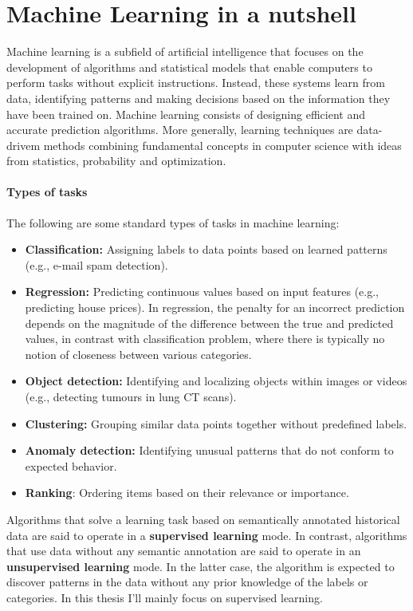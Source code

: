 \setlength{\headheight}{14.5pt} %
\addtolength{\topmargin}{-2.5pt} %
\chapter{Machine Learning in a nutshell} 

Machine learning is a subfield of artificial intelligence that focuses on the development of algorithms and statistical models that enable computers to perform tasks without explicit instructions. Instead, these systems learn from data, identifying patterns and making decisions based on the information they have been trained on.
Machine learning consists of designing efficient and accurate prediction algorithms. More generally, learning techniques are data-drivem methods combining fundamental concepts in computer science with ideas from statistics, probability and optimization.
\subsubsection{Types of tasks}
The following are some standard types of tasks in machine learning:
\begin{itemize}
    \item \textbf{Classification:} Assigning labels to data points based on learned patterns (e.g., e-mail spam detection).
    \item \textbf{Regression:} Predicting continuous values based on input features (e.g., predicting house prices). In regression, the penalty for an incorrect prediction depends on the magnitude of the difference between the true and predicted values, in contrast with classification problem, where there is typically no notion of closeness between various categories. 
    \item \textbf{Object detection:} Identifying and localizing objects within images or videos (e.g., detecting tumours in lung CT scans).
    \item \textbf{Clustering:} Grouping similar data points together without predefined labels.
    \item \textbf{Anomaly detection:} Identifying unusual patterns that do not conform to expected behavior.
    \item \textbf{Ranking}: Ordering items based on their relevance or importance.
\end{itemize}

Algorithms that solve a learning task based on semantically annotated historical data are said to operate in a \textbf{supervised learning} mode. In contrast, algorithms that use data without any semantic annotation are said to operate in an \textbf{unsupervised learning} mode. In the latter case, the algorithm is expected to discover patterns in the data without any prior knowledge of the labels or categories.
In this thesis I'll mainly focus on supervised learning. 

